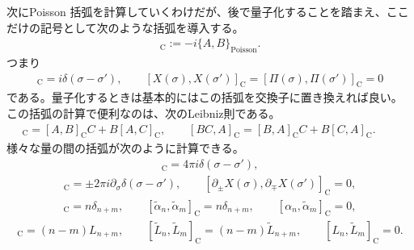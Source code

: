 \documentclass[report,paper=a4, fontsize=12pt, line_length=16cm, number_of_lines=33,dvipdfmx]{jlreq}
\numberwithin{equation}{chapter}
\numberwithin{equation}{section}
\newcommand{\del}{\partial}
\newcommand{\alphat}{\tilde{\alpha}}
\newcommand{\Lt}{\widetilde{L}}
\newcommand{\cbk}[1]{[#1]_{\mathrm{C}}}
\begin{document}
次にPoisson 括弧を計算していくわけだが、後で量子化することを踏まえ、ここだけの記号として次のような括弧を導入する。
\begin{align}
\cbk{A,B}:=-i\{A,B\}_{\mathrm{Poisson}}.
\end{align}
つまり
\begin{align}
\cbk{X(\sigma),\Pi(\sigma')}=i\delta(\sigma-\sigma'),\qquad
\cbk{X(\sigma),X(\sigma')}=
\cbk{\Pi(\sigma),\Pi(\sigma')}=0
\end{align}
である。量子化するときは基本的にはこの括弧を交換子に置き換えれば良い。
この括弧の計算で便利なのは、次のLeibniz則である。
\begin{align}
\cbk{A,BC}=\cbk{A,B}C+B\cbk{A,C},\qquad
\cbk{BC,A}=\cbk{B,A}C+B\cbk{C,A}.\qquad
\end{align}
様々な量の間の括弧が次のように計算できる。
\begin{align}
\cbk{X(\sigma),\dot{X}(\sigma')}=
4\pi i \delta(\sigma-\sigma'),
\end{align}
\begin{align}
\cbk{\del_{\pm}X(\sigma),\del_{\pm}X(\sigma')}
=\pm 2\pi i \del_{\sigma}\delta(\sigma-\sigma'),\qquad
\cbk{\del_{\pm}X(\sigma),\del_{\mp}X(\sigma')}=0,
\end{align}
\begin{align}
\cbk{\alpha_{n},\alpha_{m}}=n\delta_{n+m},\qquad
\cbk{\alphat_{n},\alphat_{m}}=n\delta_{n+m},\qquad
\cbk{\alpha_{n},\alphat_{m}}=0,
\end{align}
\begin{align}
\cbk{L_n,L_m}=(n-m)L_{n+m},\qquad
\cbk{\Lt_n,\Lt_m}=(n-m)\Lt_{n+m},\qquad
\cbk{L_n,\Lt_m}=0.
\end{align}
\end{document}
